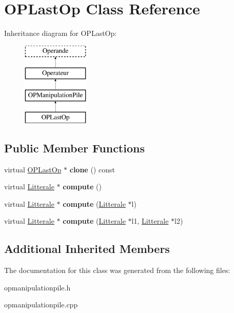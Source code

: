 \hypertarget{class_o_p_last_op}{}\section{O\+P\+Last\+Op Class Reference}
\label{class_o_p_last_op}
Inheritance diagram for O\+P\+Last\+Op\+:\begin{figure}[H]
\begin{center}
\leavevmode
\includegraphics[height=4.000000cm]{class_o_p_last_op}
\end{center}
\end{figure}
\subsection*{Public Member Functions}
\begin{DoxyCompactItemize}
\item 
virtual \hyperlink{class_o_p_last_op}{O\+P\+Last\+Op} $\ast$ {\bfseries clone} () const \hypertarget{class_o_p_last_op_a3209e7ea84a78ebc66514584b4865eef}{}\label{class_o_p_last_op_a3209e7ea84a78ebc66514584b4865eef}

\item 
virtual \hyperlink{class_litterale}{Litterale} $\ast$ {\bfseries compute} ()\hypertarget{class_o_p_last_op_a0692f09d3cf4cd2cc47cd7243f828cd0}{}\label{class_o_p_last_op_a0692f09d3cf4cd2cc47cd7243f828cd0}

\item 
virtual \hyperlink{class_litterale}{Litterale} $\ast$ {\bfseries compute} (\hyperlink{class_litterale}{Litterale} $\ast$l)\hypertarget{class_o_p_last_op_a1d219fab79fa80fa2cb58ecaac499b8a}{}\label{class_o_p_last_op_a1d219fab79fa80fa2cb58ecaac499b8a}

\item 
virtual \hyperlink{class_litterale}{Litterale} $\ast$ {\bfseries compute} (\hyperlink{class_litterale}{Litterale} $\ast$l1, \hyperlink{class_litterale}{Litterale} $\ast$l2)\hypertarget{class_o_p_last_op_a89b23f190a0e36cbbcfe8824ef620469}{}\label{class_o_p_last_op_a89b23f190a0e36cbbcfe8824ef620469}

\end{DoxyCompactItemize}
\subsection*{Additional Inherited Members}


The documentation for this class was generated from the following files\+:\begin{DoxyCompactItemize}
\item 
opmanipulationpile.\+h\item 
opmanipulationpile.\+cpp\end{DoxyCompactItemize}
